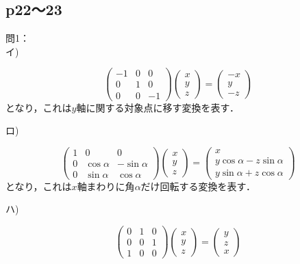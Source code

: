 \documentclass[dvipdfmx,uplatex,11pt]{jsarticle}
\theoremstyle{definition}
\begin{document}
\subsection{p22〜23}
%
%
問1：\\
イ)
%
\begin{leftbar}
    \[
        \begin{pmatrix}
            -1 & 0 & 0 \\
            0 & 1 & 0 \\
            0 & 0 & -1
        \end{pmatrix}
        \begin{pmatrix}
            x \\
            y \\
            z
        \end{pmatrix}
        =\begin{pmatrix}
            -x \\
            y \\
            -z
        \end{pmatrix}
        \]
        となり，これは$y$軸に関する対象点に移す変換を表す．
    \end{leftbar}
%
    ロ)
    \begin{leftbar}
        \[
        \begin{pmatrix}
            1 & 0 & 0 \\
            0 & \cos \alpha & -\sin \alpha \\
            0 & \sin \alpha & \cos \alpha
        \end{pmatrix}
        \begin{pmatrix}
            x \\
            y \\
            z
        \end{pmatrix}
        =
        \begin{pmatrix}
            x \\
            y \cos \alpha -z \sin \alpha \\
            y \sin \alpha + z \cos \alpha 
        \end{pmatrix}
        \]
        となり，これは$x$軸まわりに角$\alpha$だけ回転する変換を表す．
    \end{leftbar}
%
    ハ)
    \begin{leftbar}
        \[
            \begin{pmatrix}
                0 & 1 & 0 \\
                0 & 0 & 1 \\
                1 & 0 & 0
            \end{pmatrix}
            \begin{pmatrix}
                x \\
                y \\
                z
            \end{pmatrix}
            =\begin{pmatrix}
                y \\
                z \\
                x
            \end{pmatrix}
            \]
        \end{leftbar}
%
\newpage
%
%
%
\setcounter{equation}{0}
\end{document}
